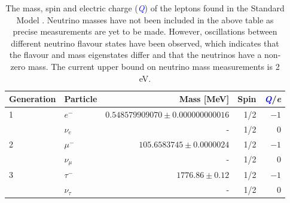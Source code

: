 \begin{table}[h!]
\centering
\begin{tabular}{l l r r r}
\hline
Generation & Particle & Mass [MeV] & Spin & \textcolor{blue}{\textit{Q}}/\textit{e} \\
\hline
1 & $e^{-}$ & $0.548579909070\pm0.000000000016$ & 1/2 & $-1$ \\
& $\nu_{e}$ & - & 1/2 & 0 \\
\hline
2 & $\mu^{-}$ & $105.6583745\pm0.0000024$ & 1/2 & $-1$ \\
& $\nu_{\mu}$ & - & 1/2 & 0 \\
\hline
3 & $\tau^{-}$ & $1776.86\pm0.12$ & 1/2 & $-1$ \\
& $\nu_{\tau}$ & - & 1/2 & 0 \\
\end{tabular}
\caption[The mass, spin and electric charge (\textcolor{blue}{\textit{Q}}) of the leptons found in the Standard Model \cite{Beringer:1900zz}.  Neutrino masses have not been included in the above table as precise measurements are yet to be made.  However, oscillations between different neutrino flavour states have been observed, which indicates that the flavour and mass eigenstates differ and that the neutrinos have a non-zero mass.  The current upper bound on neutrino mass measurements is 2 eV.]{The mass, spin and electric charge (\textcolor{blue}{\textit{Q}}) of the leptons found in the Standard Model \cite{Beringer:1900zz}.  Neutrino masses have not been included in the above table as precise measurements are yet to be made.  However, oscillations between different neutrino flavour states have been observed, which indicates that the flavour and mass eigenstates differ and that the neutrinos have a non-zero mass.  The current upper bound on neutrino mass measurements is 2 eV.}
\label{table:smleptons}
\end{table}
%
